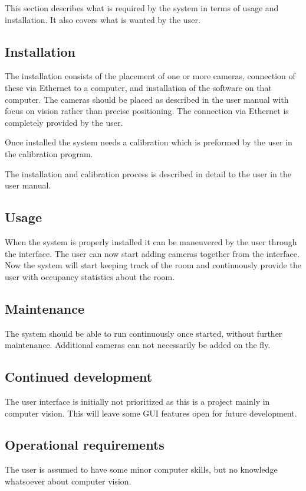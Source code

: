 This section describes what is required by the system in terms of usage and installation. It also covers what is wanted by the user. 

\subsection{Installation}
The installation consists of the placement of one or more cameras, connection of these via Ethernet to a computer, and installation of the software on that computer. The cameras should be placed as described in the user manual with focus on vision rather than precise positioning. The connection via Ethernet is completely provided by the user.     

Once installed the system needs a calibration which is preformed by the user in the calibration program.

The installation and calibration process is described in detail to the user in the user manual.

\subsection{Usage}
When the system is properly installed it can be maneuvered by the user through the interface. The user can now start adding cameras together from the interface. Now the system will start keeping track of the room and continuously provide the user with occupancy statistics about the room. 

\subsection{Maintenance}
The system should be able to run continuously once started, without further maintenance. Additional cameras can not necessarily be added on the fly. 

\subsection{Continued development}
The user interface is initially not prioritized as this is a project mainly in computer vision. This will leave some GUI features open for future development. 

\subsection{Operational requirements}
The user is assumed to have some minor computer skills, but no knowledge whatsoever about computer vision. 


\label{sec:ui_req}
\reqtable
{
}